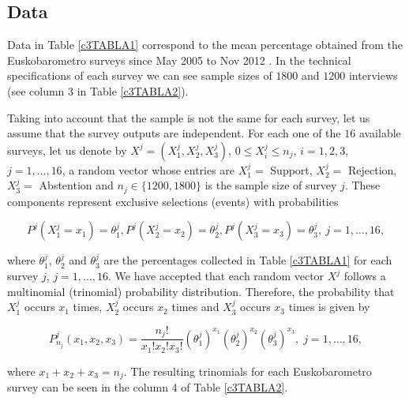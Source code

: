 \subsection{Data}
Data in Table \ref{c3TABLA1} correspond to the mean percentage obtained from the Euskobarometro surveys since May 2005 to Nov 2012 \cite[Table 20]{eusko}. In the technical specifications of each survey we can see sample sizes of $1800$ and $1200$ interviews (see column 3 in Table \ref{c3TABLA2}). 

Taking into account that the sample is not the same for each survey, let us assume that the survey outputs are independent. For each one of the $16$ available surveys, let us denote by $X^j=(X_1^j,X_2^j,X_3^j)$, $0\leq X_i^j\leq n_j$, $i=1,2,3$, $j=1,\ldots,16$, a random vector whose entries are $X_1^j = $ Support, $X_2^j = $ Rejection, $X_3^j = $ Abstention and $n_j \in \{1200,1800\}$ is the sample size of survey $j$. These components represent exclusive selections (events) with probabilities

\[
P^j(X_1^j=x_1) = \theta_1^j, P^j(X_2^j=x_2) = \theta_2^j, P^j(X_3^j=x_3) = \theta_3^j, \ j=1,\ldots,16,
\]

where $\theta_1^j$, $\theta_2^j$ and $\theta_3^j$ are the percentages collected in Table \ref{c3TABLA1} for each survey $j$, $j=1,\ldots,16$. We have accepted that each random vector $X^j$ follows a multinomial (trinomial) probability distribution. Therefore, the probability that $X_1^j$ occurs $x_1$ times, $X_2^j$ occurs $x_2$ times and $X_3^j$ occurs $x_3$ times is given by

\[
P_{n_j}^j(x_1,x_2,x_3) = \frac{n_j!}{x_1! x_2! x_3!} (\theta_1^j)^{x_1} (\theta_2^j)^{x_2} (\theta_3^j)^{x_3}, \; j=1,\ldots, 16, 
\]

where $x_1+x_2+x_3=n_j$. The resulting trinomials for each Euskobarometro survey can be seen in the column 4 of Table \ref{c3TABLA2}.

